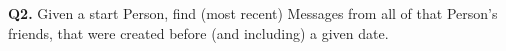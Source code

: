 \textbf{Q2.}
Given a start Person, find (most recent) Messages from all of that
Person's friends, that were created before (and including) a given date.
